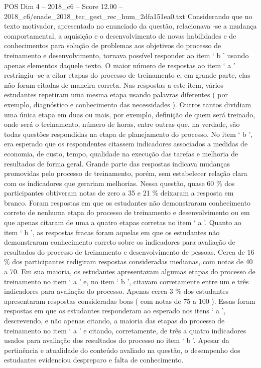 \begin{textsample}{POS Dim 4 – 2018\_c6 – Score 12.00 – 2018\_c6/enade\_2018\_tec\_gest\_rec\_hum\_2dfa151ea0.txt}
Considerando que no texto motivador, apresentado no enunciado da questão, relacionava -se a mudança comportamental, a aquisição e o desenvolvimento de novas habilidades e de conhecimentos para solução de problemas aos objetivos do processo de treinamento e desenvolvimento, tornava possível responder ao item ‘ b ’ usando apenas elementos daquele texto.
O maior número de respostas ao item ‘ a ’ restringiu -se a citar etapas do processo de treinamento e, em grande parte, elas não foram citadas de maneira correta.
Nas respostas a este item, vários estudantes repetiram uma mesma etapa usando palavras diferentes ( por exemplo, diagnóstico e conhecimento das necessidades ).
Outros tantos dividiam uma única etapa em duas ou mais, por exemplo, definição de quem será treinado, onde será o treinamento, número de horas, entre outras que, na verdade, são todas questões respondidas na etapa de planejamento do processo.
No item ‘ b ’, era esperado que os respondentes citassem indicadores associados a medidas de economia, de custo, tempo, qualidade na execução das tarefas e melhoria de resultados de forma geral.
Grande parte das respostas indicava mudanças promovidas pelo processo de treinamento, porém, sem estabelecer relação clara com os indicadores que gerariam melhorias.
Nessa questão, quase 60 \% dos participantes obtiveram notas de zero a 35 e 21 \% deixaram a resposta em branco.
Foram respostas em que os estudantes não demonstraram conhecimento correto de nenhuma etapa do processo de treinamento e desenvolvimento ou em que apenas citaram de uma a quatro etapas corretas no item ‘ a ’.
Quanto ao item ‘ b ’, as respostas fracas foram aquelas em que os estudantes não demonstraram conhecimento correto sobre os indicadores para avaliação de resultados do processo de treinamento e desenvolvimento de pessoas.
Cerca de 16 \% dos participantes redigiram respostas consideradas medianas, com notas de 40 a 70.
Em sua maioria, os estudantes apresentavam algumas etapas do processo de treinamento no item ‘ a ’ e, no item ‘ b ’, citavam corretamente entre um e três indicadores para avaliação do processo.
Apenas cerca 3 \% dos estudantes apresentaram respostas consideradas boas ( com notas de 75 a 100 ).
Essas foram respostas em que os estudantes responderam ao esperado nos itens ‘ a ’, descrevendo, e não apenas citando, a maioria das etapas do processo de treinamento no item ‘ a ’ e citando, corretamente, de três a quatro indicadores usados para avaliação dos resultados do processo no item ‘ b ’.
Apesar da pertinência e atualidade do conteúdo avaliado na questão, o desempenho dos estudantes evidenciou despreparo e falta de conhecimento.

\end{textsample}
